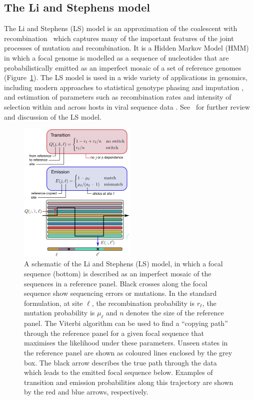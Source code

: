 \documentclass{article}
\begin{document}
\subsection{The Li and Stephens model}
\label{sec:ls}
The Li and Stephens (LS) model \citep{Li2003-ib} is an approximation of the
coalescent with recombination~\citep{Hudson1983-properties} which captures
many of the important features of the joint processes of mutation and
recombination. It is a Hidden Markov Model (HMM) in which a focal genome
is modelled as a
sequence of nucleotides that are probabilistically emitted as
an imperfect mosaic of a set of reference genomes
(Figure~\ref{fig:ls_diagram}).
The LS model is used in a wide variety
of applications in genomics, including modern approaches to
statistical genotype phasing and imputation
\citep{Delaneau2019-wl,Browning2021-cg,Browning2018-nk,Rubinacci2020-pa},
and estimation of parameters such as
recombination rates \citep[e.g.,][]{Hinch2011-tz}
and intensity of selection within and across hosts in viral
sequence data \citep[e.g.,][]{Palmer2019-wa}.
See~\cite{Mcvean2019-linkage} for further review and discussion
of the LS model.

\begin{figure} \centering
\includegraphics[width=0.5\textwidth]{figures/ls_diagram_covid.pdf}
\caption{\label{fig:ls_diagram} A schematic of the Li and Stephens (LS)
model, in which a focal sequence (bottom) is described as an
imperfect mosaic of the sequences in a reference panel.
Black crosses along the focal sequence show sequencing
errors or mutations.
In the standard formulation, at site $\ell$, the recombination probability is $r_\ell$,
the mutation probability is $\mu_\ell$ and $n$
denotes the size of the reference panel.
The Viterbi algorithm can be used to find a
``copying path'' through the reference panel for a given focal sequence that
maximises the likelihood under these parameters. Unseen states in the reference panel are shown as coloured lines enclosed by
the grey box. The black arrow describes the true path through the data which leads to the emitted
focal sequence below. Examples of transition and
emission probabilities along this trajectory are shown by the red and blue
arrows, respectively.
}
\end{figure}
\end{document}
